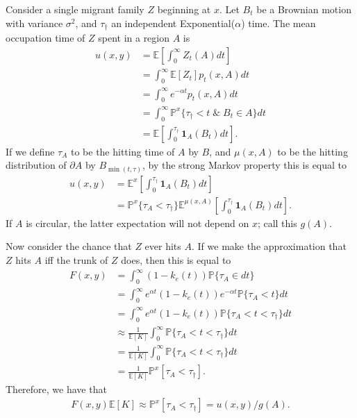 \documentclass{article}
\renewcommand{\P}{\mathbb{P}}
\newcommand{\E}{\mathbb{E}}
\newcommand{\one}{\mathbf{1}}
\begin{document}
Consider a single migrant family $Z$ beginning at $x$.
Let $B_t$ be a Brownian motion with variance $\sigma^2$, 
and $\tau_\dagger$ an independent Exponential($\alpha$) time.
The mean occupation time of $Z$ spent in a region $A$ is 
\begin{align}
    u(x,y) &= \E[\int_0^\infty Z_t(A) dt ] \\
           &= \int_0^\infty \E[Z_t] p_t(x,A) dt \\
        &= \int_0^\infty e^{-\alpha t} p_t(x,A) dt \\
        &= \int_0^\infty \P^x\{ \tau_\dagger < t \; \& \; B_t \in A \} dt \\
        &= \E[ \int_0^{\tau_\dagger} \one_A(B_t) dt ]  .
\end{align}
If we define
$\tau_A$ to be the hitting time of $A$ by $B$,
and $\mu(x,A)$ to be the hitting distribution of $\partial A$ by $B_{\min(t,\tau)}$,
by the strong Markov property this is equal to
\begin{align}
    u(x,y) &= \E^x[ \int_0^{\tau_\dagger} \one_A(B_t) dt ] \\
           &= \P^x\{ \tau_A < \tau_\dagger \}  \E^{\mu(x,A)}[ \int_0^{\tau_\dagger} \one_A(B_t) dt ] .
\end{align}
If $A$ is circular, the latter expectation will not depend on $x$;
call this $g(A)$.

Now consider the chance that $Z$ ever hits $A$.
If we make the approximation that $Z$ hits $A$ iff the trunk of $Z$ does,
then this is equal to
\begin{align}
    F(x,y) &= \int_0^\infty (1-k_e(t)) \P\{ \tau_A \in dt \} \\
           &= \int_0^\infty e^{\alpha t} (1-k_e(t)) e^{- \alpha t } \P\{ \tau_A < t \} dt \\
    &=\int_0^\infty e^{\alpha t} (1-k_e(t)) \P\{ \tau_A < t < \tau_\dagger \} dt \\
    &\approx \frac{1}{\E[K]} \int_0^\infty \P\{ \tau_A < t < \tau_\dagger \} dt \\
    &= \frac{1}{\E[K]} \int_0^\infty \P\{ \tau_A < t < \tau_\dagger \} dt \\
    &= \frac{1}{\E[K]} \P^x[ \tau_A < \tau_\dagger ] .
\end{align}
Therefore, we have that
\begin{align}
    F(x,y) \E[K] 
    \approx \P^x[ \tau_A < \tau_\dagger ] 
    = u(x,y) / g(A) .
\end{align}
\end{document}

